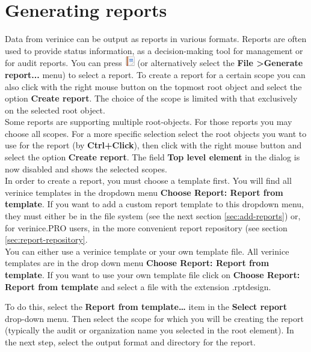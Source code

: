 \documentclass[a4paper,10pt]{book}
\begin{document}
\section{Generating reports} \label{sec:generating-reports}
Data from verinice can be output as reports in various formats.
Reports are often used to provide status information, as a decision-making tool
for management or for audit reports. You can press \includegraphics[height=2ex]{Icon/Report.png}
(or alternatively select the \textbf{File \textgreater Generate report...} menu) to select a report.
To create a report for a certain scope you can also click with the right mouse button on the topmost root object and
select the option \textbf{Create report}. The choice of the scope is limited with that exclusively on the selected root object.\\ 
Some reports are supporting multiple root-objects. For those reports you may
choose \glqq all scopes\grqq. For a more specific selection select the root objects you want to use for the report (by \textbf{Ctrl+Click}),
then click with the right mouse button and select the option \textbf{Create report}. The field \textbf{Top level element} in the dialog is now disabled and shows the selected scopes.\\

In order to create a report, you must choose a template first. 
You will find all verinice templates in the dropdown menu \textbf{Choose Report:
Report from template}. If you want to add a custom report template to this dropdown menu, they must either be in
the file system (see the next section \ref{sec:add-reports}) or, for
verinice.PRO users, in the more convenient report repository (see
section \ref{sec:report-repository}.\\

You can either use a verinice template or your own template file. All verinice templates are in the drop down menu \textbf{Choose Report: Report from template}.
If you want to use your own template file click on \textbf{Choose Report: Report from template} and select a file with the extension .rptdesign.

To do this, select the \textbf{Report from template\ldots}
item in the \textbf{Select report} drop-down menu. Then select the scope for which you will be creating the report
(typically the audit or organization name you selected in the root element). In the next step, select the output format and
directory for the report.
\end{document}
